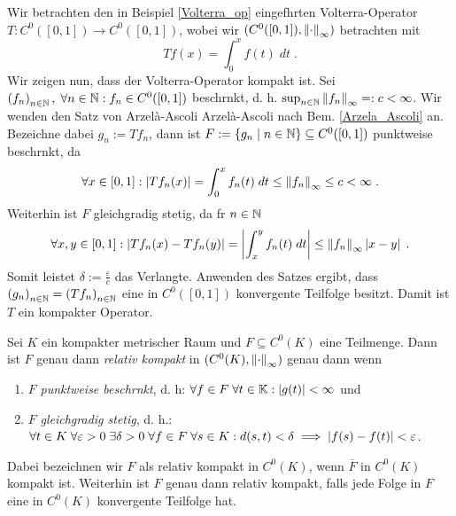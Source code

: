 \begin{ex}
	Wir betrachten den in Beispiel \ref{Volterra_op} eingef\us hrten Volterra-Operator \(T: C^0([0,1])\to C^0([0,1])\), wobei wir \((C^0([0,1]),\left\lVert\cdot\right\rVert_\infty)\) betrachten mit 
	\[Tf(x) = \int_0^x f(t) \; dt\;.\]
	Wir zeigen nun, dass der Volterra-Operator kompakt ist. Sei \(\left (f_n\right )_{n\in \mathbb{N}},\; \forall n \in \mathbb{N}: f_n \in C^0([0,1])\) beschr\as nkt, d. h. \(\sup_{n\in \mathbb{N}} \left\lVert f_n\right\rVert_\infty =: c < \infty\). Wir wenden den Satz von Arzel\`a-Ascoli Arzel\`a-Ascoli nach Bem. \ref{Arzela_Ascoli} an. Bezeichne dabei \(g_n := Tf_n\), dann ist \(F:=\left\{g_n \;\vert\; n\in \mathbb{N}\right\}\subseteq C^0([0,1])\) punktweise beschr\as nkt, da
	\[\forall x \in [0,1]: \left\lvert Tf_n(x) \right\rvert = \int_0^x f_n(t)\; dt \leq \left\lVert f_n\right\rVert_\infty \leq c < \infty\;.\]
	Weiterhin ist $F$ gleichgradig stetig, da f\us r \(n\in\mathbb{N}\)
	\[\forall x, y \in [0,1]: \left\lvert Tf_n(x) - Tf_n(y) \right\rvert = \left\lvert \int_x^y f_n(t)\;dt \right\rvert \leq \left\lVert f_n\right\rVert_\infty \left\lvert x-y \right\rvert\;.\]
	Somit leistet \(\delta := \frac{\varepsilon}{c}\) das Verlangte. Anwenden des Satzes ergibt, dass \(\left (g_n\right )_{n\in \mathbb{N}} = \left (Tf_n\right )_{n\in \mathbb{N}}\) eine in \(C^0([0,1])\) konvergente Teilfolge besitzt. Damit ist $T$ ein kompakter Operator.
\end{ex}
\begin{rem}
	\label{Arzela_Ascoli}
	Sei $K$ ein kompakter metrischer Raum und \(F \subseteq C^0(K)\) eine Teilmenge. Dann ist $F$ genau dann \textit{relativ kompakt} in \((C^0(K), \left\lVert\cdot\right\rVert_\infty)\) genau dann wenn
	\begin{enumerate}[noitemsep]
		\item $F$ \textit{punktweise beschr\as nkt}, d. h:  \(\forall f \in F\;\forall t\in \mathbb{K}: \left\lvert g(t) \right\rvert < \infty\) \;\;  und 
		\item $F$ \textit{gleichgradig stetig}, d. h.: \(\forall t \in K\;\forall \varepsilon > 0 \; \exists \delta > 0 \;\forall f\in F \; \forall s \in K: d(s,t) < 
		\delta \implies \left\lvert f(s) - f(t) \right\rvert < \varepsilon\)\;. 
	\end{enumerate}
	Dabei bezeichnen wir $F$ als relativ kompakt in $C^0(K)$, wenn $\overline{F}$ in $C^0(K)$ kompakt ist. Weiterhin ist $F$ genau dann relativ kompakt, falls jede Folge in $F$ eine in $C^0(K)$ konvergente Teilfolge hat. 
\end{rem}